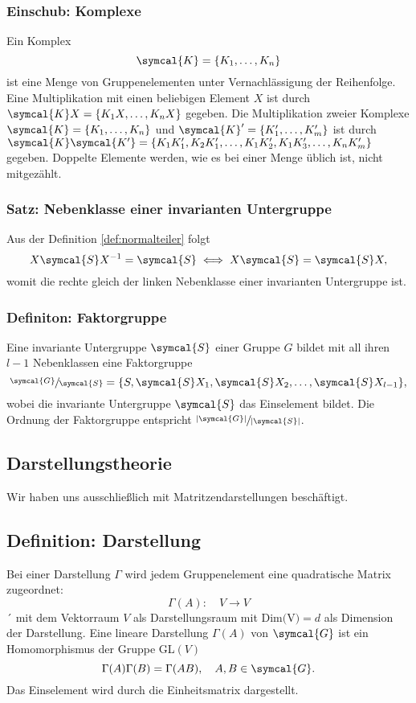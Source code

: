 \documentclass[
  captions=tableheading,  %
  titlepage=firstiscover, %
]{scrartcl}
\begin{document}
\subsubsection{Einschub: Komplexe}
Ein Komplex
\begin{equation*}
  \symcal{K} = \{ K_1, \ldots, K_n \} 
\end{equation*}
ist eine Menge von Gruppenelementen unter Vernachlässigung der Reihenfolge.
Eine Multiplikation mit einen beliebigen Element $X$ ist durch $\symcal{K}X = \{ K_1 X, \ldots, K_n X \}$ gegeben.
Die Multiplikation zweier Komplexe $\symcal{K} = \{ K_1, \ldots, K_n \} $ und $\symcal{K}' =  \{ K_1', \ldots, K_m' \} $ ist durch 
$\symcal{K}\symcal{K'} = \{ K_1 K_1', K_2 K_1', \ldots, K_1 K_2', K_1 K_3', \ldots, K_n K_m'  \} $ gegeben.
Doppelte Elemente werden, wie es bei einer Menge üblich ist, nicht mitgezählt.

\subsubsection{Satz: Nebenklasse einer invarianten Untergruppe}
Aus der Definition \ref{def:normalteiler} folgt
\begin{equation*}
  X\symcal{S}X^{-1} = \symcal{S} \iff X\symcal{S} = \symcal{S}X,
\end{equation*}
womit die rechte gleich der linken Nebenklasse einer invarianten Untergruppe ist.
\subsubsection{Definiton: Faktorgruppe}
Eine invariante Untergruppe $\symcal{S}$ einer Gruppe $G$ bildet mit all ihren $l-1$ Nebenklassen eine Faktorgruppe 
\begin{equation*}
  \sfrac{\symcal{G}}{\symcal{S}} = \{S, \symcal{S}X_1, \symcal{S}X_2, \ldots, \symcal{S}X_{l-1} \},
\end{equation*}
wobei die invariante Untergruppe $\symcal{S}$ das Einselement bildet.
Die Ordnung der Faktorgruppe entspricht $\sfrac{|\symcal{G}|}{|\symcal{S}|}$.
\subsection{Darstellungstheorie}
Wir haben uns ausschließlich mit Matritzendarstellungen beschäftigt.
\subsection{Definition: Darstellung}
Bei einer Darstellung $\Gamma$ wird jedem Gruppenelement eine quadratische Matrix zugeordnet:
\begin{equation*}
  \Gamma(A) : \quad V \to V
\end{equation*}´
mit dem Vektorraum $V$ als Darstellungsraum mit $\text{Dim(V)} = d$ als 
Dimension der Darstellung.
Eine lineare Darstellung $\Gamma (A)$ von $\symcal{G}$ ist ein Homomorphismus der Gruppe GL$(V)$
\begin{equation*}
  \Gamma(A) \Gamma(B) = \Gamma(AB), \quad A,B \in \symcal{G}.
\end{equation*} 
Das Einselement wird durch die Einheitsmatrix dargestellt.
\end{document}
